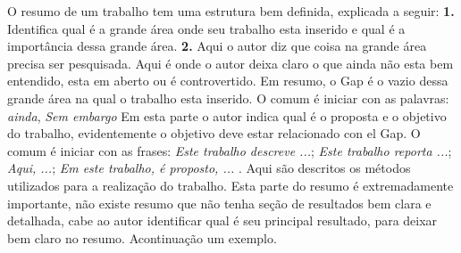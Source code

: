 
\setlength{\absparsep}{18pt} %
\begin{resumo}

 O resumo de um trabalho tem uma estrutura bem definida, explicada a seguir:
\textbf{1. }
Identifica qual é a grande área onde seu trabalho esta inserido e qual é a importância dessa grande área.
\textbf{2. }
Aqui o autor diz que coisa na grande área precisa ser pesquisada. 
Aqui é onde o autor deixa claro o que ainda não esta bem entendido, esta em aberto ou é controvertido. 
Em resumo, o Gap é o vazio dessa grande área na qual  o trabalho esta inserido. 
O comum é iniciar con as palavras: \textit{ainda}, \textit{Sem embargo}
\textbf{}
Em esta parte o autor indica qual é o proposta e o objetivo do trabalho, evidentemente o objetivo deve estar relacionado con el Gap. O comum é iniciar con as frases: \textit{Este trabalho descreve ...}; \textit{Este trabalho reporta ...}; \textit{Aqui, ...}; \textit{Em este trabalho, é proposto, ... }.
\textbf{}
Aqui são descritos os métodos utilizados para a realização do trabalho.
\textbf{}
Esta parte do resumo é extremadamente importante, não existe resumo que não tenha seção de resultados bem clara e detalhada, cabe ao autor identificar qual é seu principal resultado, para deixar bem claro no resumo.  Acontinuação um exemplo.


\end{resumo}
